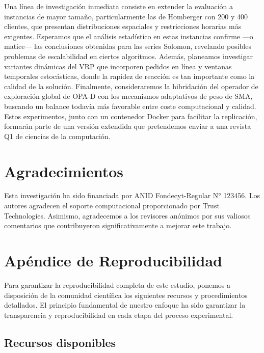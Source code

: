 \documentclass[conference,a4paper]{IEEEtran}
\begin{document}
Una línea de investigación inmediata consiste en extender la evaluación a instancias de mayor tamaño, particularmente las de Homberger con 200 y 400 clientes, que presentan distribuciones espaciales y restricciones horarias más exigentes. Esperamos que el análisis estadístico en estas instancias confirme —o matice— las conclusiones obtenidas para las series Solomon, revelando posibles problemas de escalabilidad en ciertos algoritmos. Además, planeamos investigar variantes dinámicas del VRP que incorporen pedidos en línea y ventanas temporales estocásticas, donde la rapidez de reacción es tan importante como la calidad de la solución. Finalmente, consideraremos la hibridación del operador de exploración global de OPA-D con los mecanismos adaptativos de peso de SMA, buscando un balance todavía más favorable entre coste computacional y calidad. Estos experimentos, junto con un contenedor Docker para facilitar la replicación, formarán parte de una versión extendida que pretendemos enviar a una revista Q1 de ciencias de la computación.

\section{Agradecimientos}

Esta investigación ha sido financiada por ANID Fondecyt-Regular N° 123456. Los autores agradecen el soporte computacional proporcionado por Trust Technologies. Asimismo, agradecemos a los revisores anónimos por sus valiosos comentarios que contribuyeron significativamente a mejorar este trabajo.

\section{Apéndice de Reproducibilidad}

Para garantizar la reproducibilidad completa de este estudio, ponemos a disposición de la comunidad científica los siguientes recursos y procedimientos detallados. El principio fundamental de nuestro enfoque ha sido garantizar la transparencia y reproducibilidad en cada etapa del proceso experimental.

\subsection{Recursos disponibles}
\end{document}
